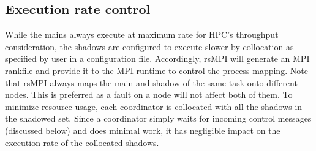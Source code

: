 \subsection{Execution rate control}
\label{sec:rate_control}
While the mains always execute at maximum rate for HPC's throughput consideration, the shadows are configured to execute slower by collocation as specified by user in a configuration file. Accordingly, rsMPI will generate an MPI rankfile and provide it to the MPI runtime to control the process mapping. Note that rsMPI always maps the main and shadow of the same task onto different nodes. This is preferred as a fault on a node will not affect both of them. 
To minimize resource usage, each coordinator is collocated with all the shadows in the shadowed set. Since a coordinator simply waits for incoming control messages (discussed below) and does minimal work, it has negligible impact on the execution rate of the collocated shadows. 


